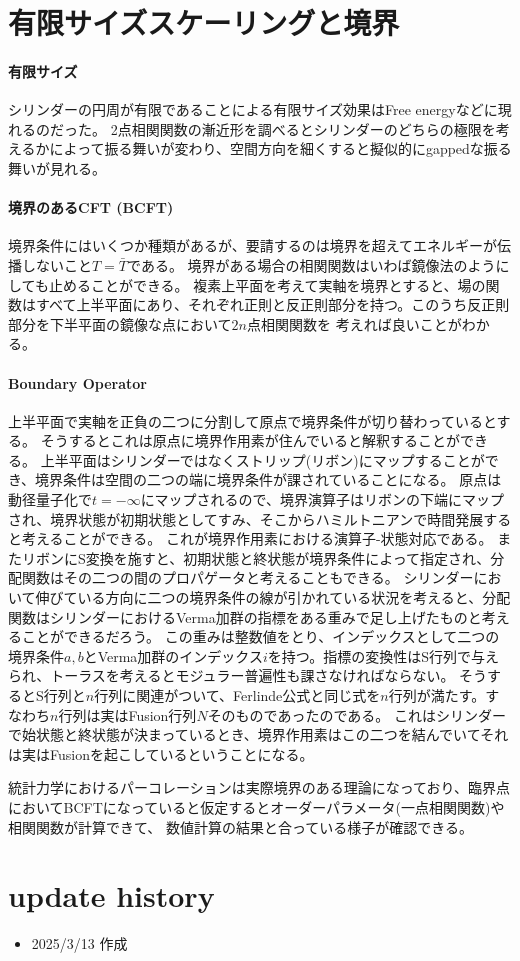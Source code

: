 \documentclass[11pt, aps, longbibliography]{article}
\numberwithin{equation}{section}
\begin{document}
    \section{有限サイズスケーリングと境界}

    \paragraph{有限サイズ}
    シリンダーの円周が有限であることによる有限サイズ効果はFree energyなどに現れるのだった。
    2点相関関数の漸近形を調べるとシリンダーのどちらの極限を考えるかによって振る舞いが変わり、空間方向を細くすると擬似的にgappedな振る舞いが見れる。
        
    \paragraph{境界のあるCFT (BCFT)}
    境界条件にはいくつか種類があるが、要請するのは境界を超えてエネルギーが伝播しないこと$T=\bar{T}$である。
    境界がある場合の相関関数はいわば鏡像法のようにしても止めることができる。
    複素上平面を考えて実軸を境界とすると、場の関数はすべて上半平面にあり、それぞれ正則と反正則部分を持つ。このうち反正則部分を下半平面の鏡像な点において$2n$点相関関数を
    考えれば良いことがわかる。

    \paragraph{Boundary Operator}
    上半平面で実軸を正負の二つに分割して原点で境界条件が切り替わっているとする。
    そうするとこれは原点に境界作用素が住んでいると解釈することができる。
    上半平面はシリンダーではなくストリップ(リボン)にマップすることができ、境界条件は空間の二つの端に境界条件が課されていることになる。
    原点は動径量子化で$t=-\infty$にマップされるので、境界演算子はリボンの下端にマップされ、境界状態が初期状態としてすみ、そこからハミルトニアンで時間発展すると考えることができる。
    これが境界作用素における演算子-状態対応である。
    またリボンにS変換を施すと、初期状態と終状態が境界条件によって指定され、分配関数はその二つの間のプロパゲータと考えることもできる。
    シリンダーにおいて伸びている方向に二つの境界条件の線が引かれている状況を考えると、分配関数はシリンダーにおけるVerma加群の指標をある重みで足し上げたものと考えることができるだろう。
    この重みは整数値をとり、インデックスとして二つの境界条件$a,b$とVerma加群のインデックス$i$を持つ。指標の変換性はS行列で与えられ、トーラスを考えるとモジュラー普遍性も課さなければならない。
    そうするとS行列と$n$行列に関連がついて、Ferlinde公式と同じ式を$n$行列が満たす。すなわち$n$行列は実はFusion行列$N$そのものであったのである。
    これはシリンダーで始状態と終状態が決まっているとき、境界作用素はこの二つを結んでいてそれは実はFusionを起こしているということになる。
    
    統計力学におけるパーコレーションは実際境界のある理論になっており、臨界点においてBCFTになっていると仮定するとオーダーパラメータ(一点相関関数)や相関関数が計算できて、
    数値計算の結果と合っている様子が確認できる。


\newpage
\section*{update history}
\begin{itemize}
    \item 2025/3/13 作成
\end{itemize}

\newpage 

\printbibliography
%
%
\end{document}
